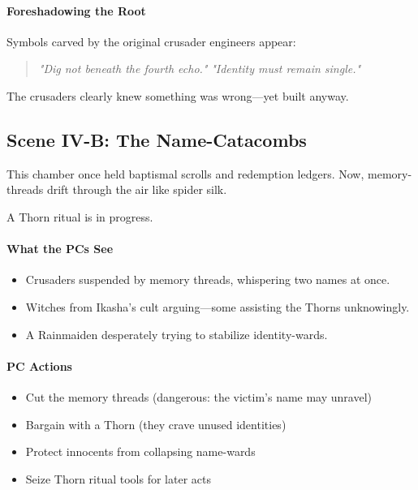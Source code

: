 \documentclass[11pt]{book}
\begin{document}
\paragraph{Foreshadowing the Root}
Symbols carved by the original crusader engineers appear:
\begin{quote}
\emph{"Dig not beneath the fourth echo."}  
\emph{"Identity must remain single."}
\end{quote}

The crusaders clearly knew something was wrong---yet built anyway.

\subsection*{Scene IV-B: The Name-Catacombs}

This chamber once held baptismal scrolls and redemption ledgers.
Now, memory-threads drift through the air like spider silk.

A Thorn ritual is in progress.

\paragraph{What the PCs See}
\begin{itemize}[leftmargin=*]
    \item Crusaders suspended by memory threads, whispering two names at once.
    \item Witches from Ikasha's cult arguing---some assisting the Thorns unknowingly.
    \item A Rainmaiden desperately trying to stabilize identity-wards.
\end{itemize}

\paragraph{PC Actions}
\begin{itemize}
    \item Cut the memory threads (dangerous: the victim's name may unravel)
    \item Bargain with a Thorn (they crave unused identities)
    \item Protect innocents from collapsing name-wards
    \item Seize Thorn ritual tools for later acts
\end{itemize}
\end{document}
